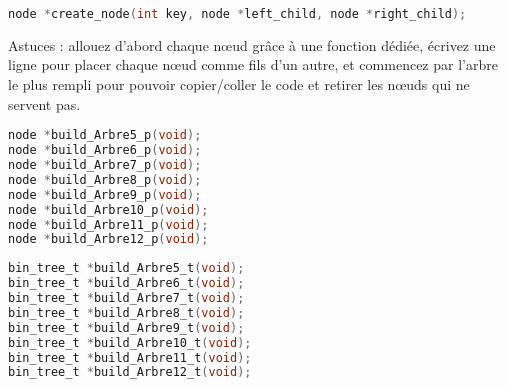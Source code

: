 \documentclass[11pt,a4paper]{article}
\begin{document}
\begin{lstlisting}[language=C]
node *create_node(int key, node *left_child, node *right_child); \end{lstlisting}





Astuces : allouez d'abord chaque nœud grâce à une fonction dédiée, écrivez une ligne pour placer chaque nœud comme fils d'un autre, et commencez par l'arbre le plus rempli pour pouvoir copier/coller le code et retirer les nœuds qui ne servent pas.


\begin{table}[ht!]
  \centering
  \begin{minipage}{0.4\textwidth}
    \centering

\begin{lstlisting}[language=C]
node *build_Arbre5_p(void);
node *build_Arbre6_p(void);
node *build_Arbre7_p(void);
node *build_Arbre8_p(void);
node *build_Arbre9_p(void);
node *build_Arbre10_p(void);
node *build_Arbre11_p(void);
node *build_Arbre12_p(void); \end{lstlisting}

  \end{minipage}
  \hfillx
  \begin{minipage}{0.5\textwidth}
    \centering

\begin{lstlisting}[language=C]
bin_tree_t *build_Arbre5_t(void);
bin_tree_t *build_Arbre6_t(void);
bin_tree_t *build_Arbre7_t(void);
bin_tree_t *build_Arbre8_t(void);
bin_tree_t *build_Arbre9_t(void);
bin_tree_t *build_Arbre10_t(void);
bin_tree_t *build_Arbre11_t(void);
bin_tree_t *build_Arbre12_t(void); \end{lstlisting}

  \end{minipage}
\end{table}

\end{document}
